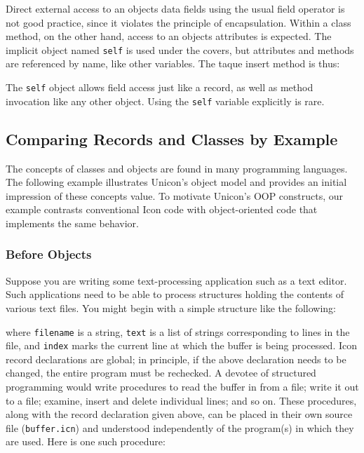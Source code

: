 Direct external access to an object{\textquotesingle}s data fields using
the usual field operator is not good practice, since it violates the
principle of encapsulation. Within a class method, on the other hand,
access to an object{\textquotesingle}s attributes is expected. The
implicit object named \texttt{self} is used under the covers, but
attributes and methods are referenced by name, like other variables.
The taque insert method is thus: 


The \texttt{self} object allows field access just like a record, as well
as method invocation like any other object. Using the \texttt{self}
variable explicitly is rare.

\subsection{Comparing Records and Classes by Example}

The concepts of classes and objects are found in many programming
languages. The following example illustrates Unicon's object model
and provides an initial impression of these
concepts{\textquotesingle} value. To motivate Unicon's OOP
constructs, our example contrasts conventional Icon
code with object-oriented code that implements the same behavior.

\subsubsection{Before Objects}

Suppose you are writing some text-processing application such as a text
editor. Such applications need to be able to process
structures holding the contents of various text files. You might begin
with a simple structure like the following: 


\noindent
where \texttt{filename} is a string, \texttt{text} is a list of strings
corresponding to lines in the file, and \texttt{index} marks
the current line at which the buffer is being processed. Icon record
declarations are global; in principle, if the above declaration needs
to be changed, the entire program must be rechecked. A devotee of
structured programming would write procedures to read the buffer
in from a file; write it out to a file; examine, insert and delete
individual lines; and so on. These procedures, along with the record
declaration given above, can be placed in their own source file
(\texttt{buffer.icn}) and understood independently of the program(s) in
which they are used. Here is one such procedure: 

